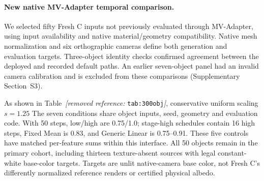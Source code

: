 \documentclass[times,twocolumn,final]{elsarticle}
\providecommand{\DIFadd}[1]{{\protect\color{blue} \sf #1}} %
\providecommand{\DIFdel}[1]{{\protect\color{red} \scriptsize #1}} %
\providecommand{\DIFaddbegin}{} %
\providecommand{\DIFaddend}{} %
\providecommand{\DIFdelbegin}{} %
\providecommand{\DIFdelend}{} %
\begin{document}
\DIFdelbegin %
\DIFdelend \DIFaddbegin \paragraph{New native MV-Adapter temporal comparison.}
\label{subsec:new-mva}
\DIFadd{We selected fifty Fresh C inputs not previously evaluated through MV-Adapter, using input availability and native material/geometry compatibility. Native mesh normalization and six orthographic cameras define both generation and evaluation targets. Three-object identity checks confirmed agreement between the deployed and recorded default paths. An earlier seven-object panel had an invalid camera calibration and is excluded from these comparisons (Supplementary Section~S3).
}\DIFaddend 

\DIFdelbegin \DIFdel{As shown in Table~\textit{[removed reference: }\texttt{tab:300obj}\textit{]}, conservative uniform scaling $s = 1.25$ }\DIFdelend \DIFaddbegin \DIFadd{The seven conditions share object inputs, seed, geometry and evaluation code. With 50 steps, low/high are 0.75/1.0; stage-high schedules contain 16 high steps, Fixed Mean is 0.83, and Generic Linear is 0.75--0.91. These five controls have matched per-feature sums within this interface. All 50 objects remain in the primary cohort, including thirteen texture-absent sources with legal constant-white base-color targets. Targets are unlit native-camera base color, not Fresh C's differently normalized reference renders or certified physical albedo.
}
\end{document}
